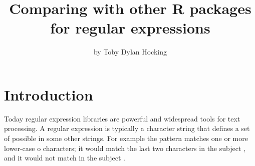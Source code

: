 
\newcommand{\sectiontidyr}{Comparing \code{namedCapture::df\_match\_variable} with \code{tidyr::extract}}
\newcommand{\sectiontrackDb}{Extract all matches from a multi-line text file via \code{str\_match\_all\_variable}}
\newcommand{\sectiontimings}{Comparing computation times of R regex packages}
\newcommand{\sectiondf}{\code{df\_match\_variable} extracts new columns from character columns in a data.frame}
\newcommand{\sectionrex}{Comparing \CRANpkg{namedCapture} variable argument syntax with \CRANpkg{rex}}


\title{Comparing  with other R packages for 
  regular expressions}

\author{by Toby Dylan Hocking}

\maketitle


\section{Introduction}

Today regular expression libraries are powerful and widespread tools
for text processing. A regular expression  is
typically a character string that defines a set of possible
 in some other  strings. For example
the pattern  matches one or more lower-case o characters; it
would match the last two characters in the subject , and it
would not match in the subject . 


